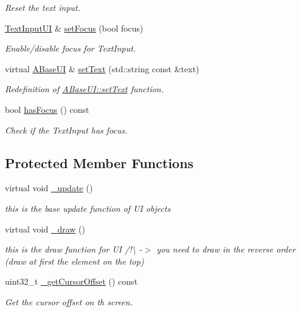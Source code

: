 \begin{DoxyCompactItemize}
\begin{DoxyCompactList}\small\item\em Reset the text input. \end{DoxyCompactList}\item 
\hyperlink{class_text_input_u_i}{Text\+Input\+UI} \& \hyperlink{class_text_input_u_i_a9d3e40a9360c1b17394647d23303df66}{set\+Focus} (bool focus)
\begin{DoxyCompactList}\small\item\em Enable/disable focus for Text\+Input. \end{DoxyCompactList}\item 
virtual \hyperlink{class_a_base_u_i}{A\+Base\+UI} \& \hyperlink{class_text_input_u_i_a2897827565bcb1d849cd36d3c9baf7a9}{set\+Text} (std\+::string const \&text)
\begin{DoxyCompactList}\small\item\em Redefinition of \hyperlink{class_a_base_u_i_a82e182bfd577d37224aa49be3f64ac87}{A\+Base\+U\+I\+::set\+Text} function. \end{DoxyCompactList}\item 
bool \hyperlink{class_text_input_u_i_a7e514dfb73cea540536ea85260bc55fd}{has\+Focus} () const
\begin{DoxyCompactList}\small\item\em Check if the Text\+Input has focus. \end{DoxyCompactList}\end{DoxyCompactItemize}
\subsection*{Protected Member Functions}
\begin{DoxyCompactItemize}
\item 
\mbox{\label{class_text_input_u_i_a00ae7b0bc39a734d3f3ecdbc209115d3}} 
virtual void \hyperlink{class_text_input_u_i_a00ae7b0bc39a734d3f3ecdbc209115d3}{\+\_\+update} ()
\begin{DoxyCompactList}\small\item\em this is the base update function of UI objects \end{DoxyCompactList}\item 
\mbox{\label{class_text_input_u_i_ab367a04c577afe7fb08ddca20dbcd94b}} 
virtual void \hyperlink{class_text_input_u_i_ab367a04c577afe7fb08ddca20dbcd94b}{\+\_\+draw} ()
\begin{DoxyCompactList}\small\item\em this is the draw function for UI /!\textbackslash{} -\/$>$ you need to draw in the reverse order (draw at first the element on the top) \end{DoxyCompactList}\item 
uint32\+\_\+t \hyperlink{class_text_input_u_i_a1c4f30cc2118a3820843d6933dcbdaea}{\+\_\+get\+Cursor\+Offset} () const
\begin{DoxyCompactList}\small\item\em Get the cursor offset on th screen. \end{DoxyCompactList}\end{DoxyCompactItemize}
